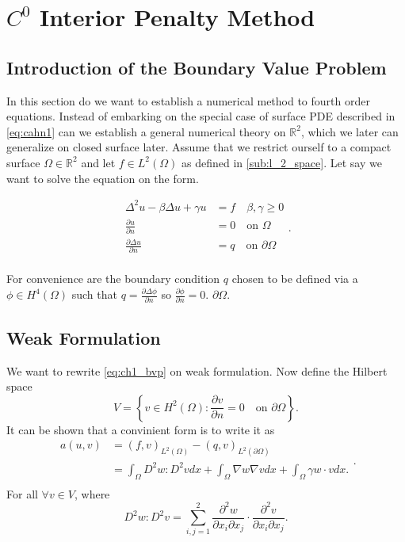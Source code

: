 \section{$C^0$ Interior Penalty Method}
\label{sec:ch1}

\subsection{Introduction of the Boundary Value Problem}%
\label{sub:introduction_of_the_bvp}


In this section do we want to establish a numerical method to fourth order equations. Instead of embarking on the
special case of surface PDE described in \eqref{eq:cahn1} can we establish a general numerical theory on $\mathbb{R} ^2$, which we later can generalize on closed surface later. Assume that we restrict ourself to a compact surface $\Omega \in \mathbb{R} ^2 $ and let $f \in L^{2}\left( \Omega
\right) $ as defined in \ref{sub:l_2_space}.
Let say we want to solve the equation on the form.

\begin{equation}
\label{eq:ch1_bvp}
\begin{split}
    \Delta ^2 u - \beta \Delta u + \gamma u &= f \quad \beta , \gamma \ge 0 \\
    \frac{\partial u}{\partial  n}  &= 0 \quad \text{on }\Omega  \\
    \frac{\partial \Delta u}{\partial  n}  &= q \quad \text{on } \partial \Omega  \\
\end{split}
.\end{equation}

For convenience are the boundary condition $q$ chosen to be defined via a  $\phi \in H^{4}\left( \Omega  \right)$
such that $q = \frac{\partial \Delta \phi }{\partial  n} $ so $\frac{\partial \phi }{\partial  n}  = 0$.
$\partial \Omega $.


\subsection{Weak Formulation}%
\label{sub:weak_formulation}

We want to rewrite \eqref{eq:ch1_bvp} on weak formulation. Now define the Hilbert space \[
V = \left\{ v \in H^2\left( \Omega  \right): \frac{\partial v}{\partial  n}  = 0 \quad \text{on } \partial \Omega
\right\}.
\]
It can be shown \cite{gu2012c0} that a convinient form is to write it as
\begin{equation}
\label{eq:weakform}
    \begin{split}
a\left( u,v \right) &=  \left( f,v \right)_{L^2\left( \Omega  \right)}  - \left( q,v \right)_{L^2\left( \partial \Omega  \right)}  \\
& = \int_{\Omega }^{} D^2 w : D^2 v dx +  \int_{\Omega }^{} \nabla w \nabla v dx + \int_{\Omega }^{} \gamma w \cdot v dx
.\\
    \end{split}
.\end{equation}
For all $\forall v \in  V$, where \[
D^2 w : D^2 v = \sum_{i,j=1}^{2}  \frac{\partial ^2 w}{\partial x_{i} \partial x_{j} } \cdot  \frac{\partial ^2 v
}{\partial x_{i} \partial x_{j} }.
\]

